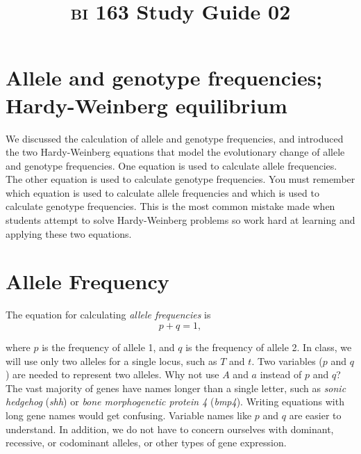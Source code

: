 \documentclass[letterpaper]{tufte-handout}
\title{{\scshape bi} 163 Study Guide 02}
\date{} %
\begin{document}
\maketitle	%

\section*{Allele and genotype frequencies; Hardy-Weinberg equilibrium}

We 
discussed the calculation of allele and genotype frequencies, and
introduced the two Hardy-Weinberg equations that model the evolutionary
change of allele and genotype frequencies. One equation is used to 
calculate allele frequencies. The other equation is used to calculate 
genotype frequencies. You must remember which equation is used to 
calculate allele frequencies and which is used to calculate genotype 
frequencies. This is the most common mistake made when students 
attempt to solve Hardy-Weinberg problems so work hard at learning
and applying these two equations.

\section{Allele Frequency}

The equation for calculating \emph{allele frequencies} is 
\begin{equation*}
p+q = 1,
\end{equation*}

where $p$ is the frequency of allele 1, and $q$ is the frequency of allele 2. In class, we will use only two alleles for a single locus, such as $T$ and $t$.  Two variables ($p$ and $q$) are needed to represent two alleles.  Why not use $A$ and $a$ instead of $p$ and $q$?  The vast majority of genes have names longer than a single letter, such as \emph{sonic hedgehog} (\emph{shh}) or \emph{bone morphogenetic protein 4} (\emph{bmp4}). Writing equations with long gene names would get confusing. Variable names like $p$ and $q$ are easier to understand.  In addition, we do not have to concern ourselves with dominant, recessive, or codominant alleles, or other types of gene expression. 
\end{document}
